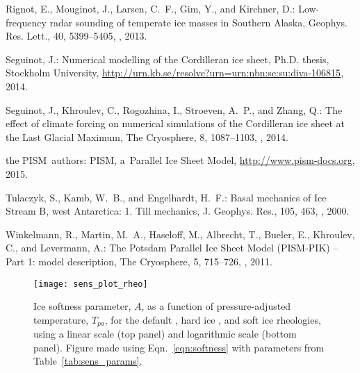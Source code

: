 \begin{thebibliography}{69}
Rignot, E., Mouginot, J., Larsen, C.~F., Gim, Y., and Kirchner, D.:
  Low-frequency radar sounding of temperate ice masses in Southern Alaska,
  Geophys. Res. Lett., 40, 5399--5405, , 2013.

Seguinot, J.: Numerical modelling of the Cordilleran ice sheet, Ph.D. thesis,
  Stockholm University,
  \urlprefix\url{http://urn.kb.se/resolve?urn=urn:nbn:se:su:diva-106815}, 2014.

Seguinot, J., Khroulev, C., Rogozhina, I., Stroeven, A.~P., and Zhang, Q.: The
  effect of climate forcing on numerical simulations of the {C}ordilleran ice
  sheet at the {L}ast {G}lacial {M}aximum, The Cryosphere, 8, 1087--1103,
  , 2014.

the PISM~authors: {PISM}, a~{P}arallel {I}ce {S}heet {M}odel,
  \urlprefix\url{http://www.pism-docs.org}, 2015.

Tulaczyk, S., Kamb, W.~B., and Engelhardt, H.~F.: Basal mechanics of Ice Stream
  B, west Antarctica: 1. Till mechanics, J. Geophys. Res., 105, 463,
  , 2000.

Winkelmann, R., Martin, M.~A., Haseloff, M., Albrecht, T., Bueler, E.,
  Khroulev, C., and Levermann, A.: The {P}otsdam {P}arallel {I}ce {S}heet
  {M}odel ({PISM-PIK}) -- Part 1: model description, The Cryosphere, 5,
  715--726, , 2011.

\end{thebibliography}


\begin{figure}
    \centering
    \texttt{[image: sens\_plot\_rheo]}
    \caption{Ice softness parameter, $A$, as a function of pressure-adjusted
             temperature, $T_{pa}$, for the default \citep{Paterson.Budd.1982},
             hard ice \citep[with $E_{SIA}=1$]{Cuffey.Paterson.2010}, and soft ice
             \citep[with $E_{SIA}=5$]{Cuffey.Paterson.2010} rheologies, using
             a linear scale (top panel) and logarithmic scale (bottom panel).
             Figure made using Eqn.~\ref{eqn:softness} with parameters from
             Table~\ref{tab:sens_params}.}
    \label{fig:sens_plot_rheo}
\end{figure}

